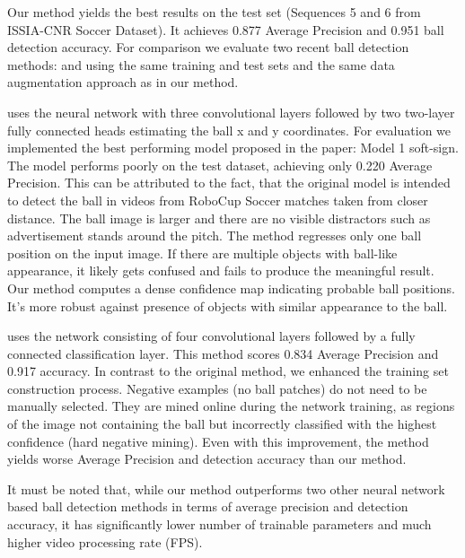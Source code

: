 \documentclass[a4paper,twoside]{article}
\begin{document}
Our method yields the best results on the test set (Sequences 5 and 6 from ISSIA-CNR Soccer Dataset). It achieves 0.877 Average Precision and 0.951 ball detection accuracy. 
For comparison we evaluate two recent ball detection methods: \cite{Spec17} and \cite{Reno18} using the same training and test sets and the same data augmentation approach as in our method. 

\cite{Spec17} uses the neural network with three convolutional layers followed by two two-layer fully connected heads estimating the ball x and y coordinates. 
For evaluation we implemented the best performing model proposed in the paper: Model 1 soft-sign. The model performs poorly on the test dataset, achieving only 0.220 Average Precision. 
This can be attributed to the fact, that the original model is intended to detect the ball in videos from RoboCup Soccer matches taken from closer distance. The ball image is larger and there are no visible distractors such as advertisement stands around the pitch.
The method regresses only one ball position on the input image. If there are multiple objects with ball-like appearance, it likely gets confused and fails to produce the meaningful result.
Our method computes a dense confidence map indicating probable ball positions.
It's more robust against presence of objects with similar appearance to the ball.

\cite{Reno18} uses the network consisting of four convolutional layers followed by a fully connected classification layer. This method scores 0.834 Average Precision and 0.917 accuracy. In contrast to the original method, we enhanced the training set construction process. Negative examples (no ball patches) do not need to be manually selected. They are mined online during the network training, as regions of the image not containing the ball but incorrectly classified with the highest confidence (hard negative mining). 
Even with this improvement, the method yields worse Average Precision and detection accuracy than our method.

It must be noted that, while our method outperforms two other neural network based ball detection methods in terms of average precision and detection accuracy, it has significantly lower number of trainable parameters and much higher video processing rate (FPS).
\end{document}
